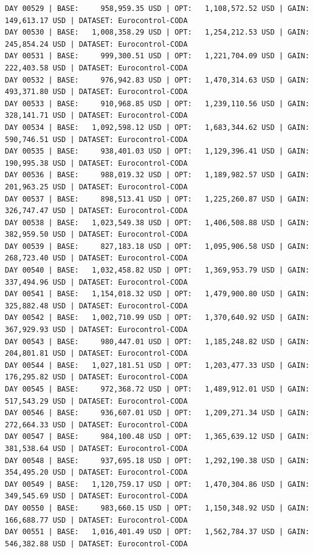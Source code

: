 \documentclass[11pt,a4paper]{article}
\begin{document}
\begin{verbatim}
DAY 00529 | BASE:     958,959.35 USD | OPT:   1,108,572.52 USD | GAIN: 149,613.17 USD | DATASET: Eurocontrol-CODA
DAY 00530 | BASE:   1,008,358.29 USD | OPT:   1,254,212.53 USD | GAIN: 245,854.24 USD | DATASET: Eurocontrol-CODA
DAY 00531 | BASE:     999,300.51 USD | OPT:   1,221,704.09 USD | GAIN: 222,403.58 USD | DATASET: Eurocontrol-CODA
DAY 00532 | BASE:     976,942.83 USD | OPT:   1,470,314.63 USD | GAIN: 493,371.80 USD | DATASET: Eurocontrol-CODA
DAY 00533 | BASE:     910,968.85 USD | OPT:   1,239,110.56 USD | GAIN: 328,141.71 USD | DATASET: Eurocontrol-CODA
DAY 00534 | BASE:   1,092,598.12 USD | OPT:   1,683,344.62 USD | GAIN: 590,746.51 USD | DATASET: Eurocontrol-CODA
DAY 00535 | BASE:     938,401.03 USD | OPT:   1,129,396.41 USD | GAIN: 190,995.38 USD | DATASET: Eurocontrol-CODA
DAY 00536 | BASE:     988,019.32 USD | OPT:   1,189,982.57 USD | GAIN: 201,963.25 USD | DATASET: Eurocontrol-CODA
DAY 00537 | BASE:     898,513.41 USD | OPT:   1,225,260.87 USD | GAIN: 326,747.47 USD | DATASET: Eurocontrol-CODA
DAY 00538 | BASE:   1,023,549.38 USD | OPT:   1,406,508.88 USD | GAIN: 382,959.50 USD | DATASET: Eurocontrol-CODA
DAY 00539 | BASE:     827,183.18 USD | OPT:   1,095,906.58 USD | GAIN: 268,723.40 USD | DATASET: Eurocontrol-CODA
DAY 00540 | BASE:   1,032,458.82 USD | OPT:   1,369,953.79 USD | GAIN: 337,494.96 USD | DATASET: Eurocontrol-CODA
DAY 00541 | BASE:   1,154,018.32 USD | OPT:   1,479,900.80 USD | GAIN: 325,882.48 USD | DATASET: Eurocontrol-CODA
DAY 00542 | BASE:   1,002,710.99 USD | OPT:   1,370,640.92 USD | GAIN: 367,929.93 USD | DATASET: Eurocontrol-CODA
DAY 00543 | BASE:     980,447.01 USD | OPT:   1,185,248.82 USD | GAIN: 204,801.81 USD | DATASET: Eurocontrol-CODA
DAY 00544 | BASE:   1,027,181.51 USD | OPT:   1,203,477.33 USD | GAIN: 176,295.82 USD | DATASET: Eurocontrol-CODA
DAY 00545 | BASE:     972,368.72 USD | OPT:   1,489,912.01 USD | GAIN: 517,543.29 USD | DATASET: Eurocontrol-CODA
DAY 00546 | BASE:     936,607.01 USD | OPT:   1,209,271.34 USD | GAIN: 272,664.33 USD | DATASET: Eurocontrol-CODA
DAY 00547 | BASE:     984,100.48 USD | OPT:   1,365,639.12 USD | GAIN: 381,538.64 USD | DATASET: Eurocontrol-CODA
DAY 00548 | BASE:     937,695.18 USD | OPT:   1,292,190.38 USD | GAIN: 354,495.20 USD | DATASET: Eurocontrol-CODA
DAY 00549 | BASE:   1,120,759.17 USD | OPT:   1,470,304.86 USD | GAIN: 349,545.69 USD | DATASET: Eurocontrol-CODA
DAY 00550 | BASE:     983,660.15 USD | OPT:   1,150,348.92 USD | GAIN: 166,688.77 USD | DATASET: Eurocontrol-CODA
DAY 00551 | BASE:   1,016,401.49 USD | OPT:   1,562,784.37 USD | GAIN: 546,382.88 USD | DATASET: Eurocontrol-CODA

\end{verbatim}
\end{document}
